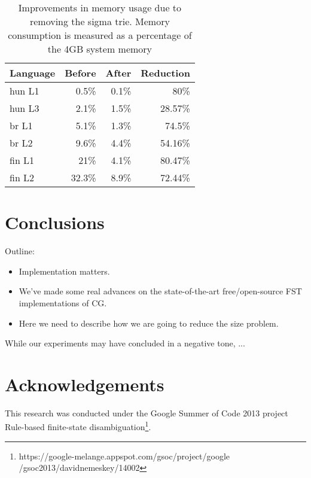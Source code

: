 \documentclass{article}
\begin{document}
\begin{table}[h]
  \centering
  \caption{Improvements in memory usage due to removing the sigma trie. Memory
           consumption is measured as a percentage of the 4GB system memory}
  \label{tab:sigma_memory}
  \begin{tabular}{ | l | r | r | r | }
  \hline
  \textbf{Language} & \textbf{Before} & \textbf{After} & \textbf{Reduction} \\
  \hline
  hun L1 & 0.5\% & 0.1\% & 80\% \\
  hun L3 & 2.1\% & 1.5\% & 28.57\% \\
  br L1 & 5.1\% & 1.3\% & 74.5\% \\
  br L2 & 9.6\% & 4.4\% & 54.16\% \\
  fin L1 & 21\% & 4.1\% & 80.47\% \\
  fin L2 & 32.3\% & 8.9\% & 72.44\% \\
  \hline
  \end{tabular}
\end{table}

\section{Conclusions}
\label{sec:conclusion}
Outline:
\begin{itemize}
\item Implementation matters.
\item We've made some real advances on the state-of-the-art free/open-source
  FST implementations of CG. 
\item Here we need to describe how we are going to reduce the size problem.
\end{itemize}
While our experiments may have concluded in a negative tone, ...

\section*{Acknowledgements}
This research was conducted under the Google Summer of Code 2013 project
Rule-based finite-state disambiguation\footnote{https://google-melange.appspot.com/gsoc/project/google
/gsoc2013/davidnemeskey/14002}.

\cite{Karlsson:1990} %
\cite{Hulden:2011} %
\cite{Peltonen:2011} %
\cite{Tapanainen:1996} %



\end{document}
